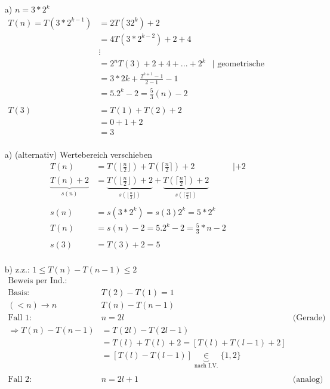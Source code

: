 \documentclass[ngerman,a4paper]{report}
\begin{document}
\begin{enumerate}
\item[a)] $n =3 * 2^k$
\begin{align*}
T(n) = T(3 * 2^{k-1}) &= 2T(3 2^k)+2\\
&= 4T (3 * 2^{k-2}) + 2 + 4\\
& \vdots\\
&= 2^nT(3)+2+4+...+2^k &| \text{ geometrische Reihe...}\\
&= 3 * 2k + \frac{2^{k+1}-1}{2-1} -1\\
&= 5.2^k -2 = \frac{5}{3}(n)-2\\
\\
T(3) &= T(1) + T(2) + 2\\
&= 0 + 1+ 2\\
&= 3\\
\end{align*} 
\item[a) (alternativ)] Wertebereich verschieben
\begin{align*}
T(n) &= T(\lfloor \frac{n}{2} \rfloor) + T(\lceil \frac{n}{2} \rceil) +2 & | +2\\
\underbrace{T(n) + 2}_{s(n)} &= \underbrace{T(\lfloor \frac{n}{2} \rfloor) + 2}_{s(\lfloor \frac{n}{2} \rfloor)} + \underbrace{T(\lceil \frac{n}{2} \rceil) +2}_{s(\lceil \frac{n}{2} \rceil)}\\
\\
s(n) &= s(3 * 2^k) = s(3)2^k = 5*2^k\\
T(n) &= s(n)-2 = 5.2^k -2 = \frac{5}{3}*n-2\\
\\
s(3) &= T(3) + 2 = 5\\
\end{align*}
\item[b)] z.z.: $1\leq T(n)-T(n-1)\leq 2$
\begin{align*}
\text{Beweis per Ind.:}\quad &\\
\text{Basis:}\quad &T(2)-T(1) = 1\\
(<n) \rightarrow n \quad &T(n)-T(n-1)\\
\text{Fall 1:}\quad\quad & n = 2l	&\text{(Gerade)}\\
\Rightarrow T(n) - T(n-1) &= T(2l) - T(2l-1)\\
&= T(l) + T(l) + 2 = [T(l) + T(l-1) + 2]\\
&= [T(l)-T(l-1)] \underbrace{ \in}_{\text{nach I.V.}} \{1,2\}\\
\\
\text{Fall 2:}\quad\quad & n = 2l + 1	&\text{(analog)}\\

\end{align*}
\end{enumerate}
\end{document}
